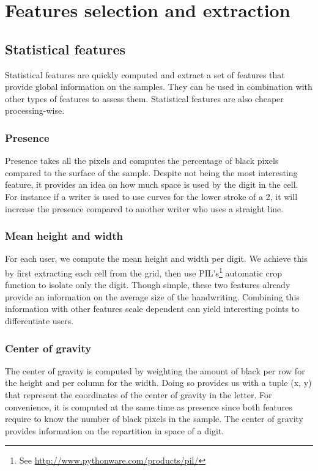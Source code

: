 \documentclass[a4paper]{article}
\begin{document}
{\section{Features selection and extraction}
\subsection{Statistical features}

Statistical features are quickly computed and extract a set of features that provide global information on the samples. They can be used in combination with other types of features to assess them. Statistical features are also cheaper processing-wise.

\subsubsection{Presence}
Presence takes all the pixels and computes the percentage of black pixels compared to the surface of the sample. Despite not being the most interesting feature, it provides an idea on how much space is used by the digit in the cell. For instance if a writer is used to use curves for the lower stroke of a 2, it will increase the presence compared to another writer who uses a straight line.

\subsubsection{Mean height and width}
For each user, we compute the mean height and width per digit. We achieve this by first extracting each cell from the grid, then use PIL’s\footnote{See \url{http://www.pythonware.com/products/pil/}} automatic crop function to isolate only the digit. Though simple, these two features already provide an information on the average size of the handwriting. Combining this information with other features scale dependent can yield interesting points to differentiate users.

\subsubsection{Center of gravity}
The center of gravity is computed by weighting the amount of black per row for the height and per column for the width. Doing so provides us with a tuple (x, y) that represent the coordinates of the center of gravity in the letter. For convenience, it is computed at the same time as presence since both features require to know the number of black pixels in the sample. The center of gravity provides information on the repartition in space of a digit.

}
\end{document}
